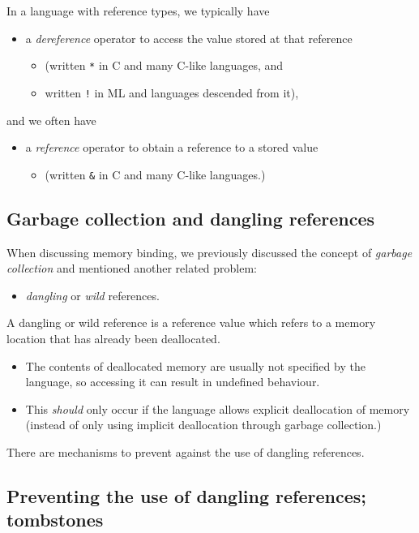 \documentclass[11pt]{article}
\theoremstyle{definition}
\begin{document}
In a language with reference types, we typically have
\begin{itemize}
\item a \emph{dereference} operator to access the value
stored at that reference
\begin{itemize}
\item (written \texttt{*} in C and many C-like languages, and
\item written \texttt{!} in ML and languages descended from it),
\end{itemize}
\end{itemize}
and we often have
\begin{itemize}
\item a \emph{reference} operator to obtain a reference to a stored value
\begin{itemize}
\item (written \texttt{\&} in C and many C-like languages.)
\end{itemize}
\end{itemize}

\subsection{Garbage collection and dangling references}
\label{sec:orgcb725e3}

When discussing memory binding, we previously discussed
the concept of \emph{garbage collection} and mentioned
another related problem:
\begin{itemize}
\item \emph{dangling} or \emph{wild} references.
\end{itemize}

A dangling or wild reference is a reference value
which refers to a memory location that has already been deallocated.
\begin{itemize}
\item The contents of deallocated memory are usually not specified
by the language, so accessing it can result in undefined behaviour.
\item This \emph{should} only occur if the language allows explicit deallocation
of memory (instead of only using implicit deallocation
through garbage collection.)
\end{itemize}

There are mechanisms to prevent against the use of dangling references.

\subsection{Preventing the use of dangling references; tombstones}
\label{sec:org13804b1}
\end{document}
